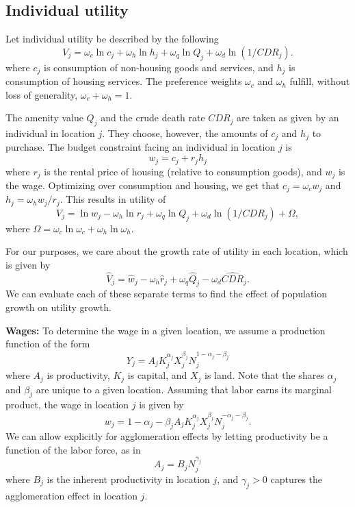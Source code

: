 \documentclass[10pt]{article}
\begin{document}
\onehalfspacing 

\subsection{Individual utility}
Let individual utility be described by the following
\begin{equation}
    V_j = \omega_c \ln c_j + \omega_h \ln h_j + \omega_q \ln Q_j + \omega_d \ln (1/CDR_j).
\end{equation}
where $c_j$ is consumption of non-housing goods and services, and $h_j$ is consumption of housing services. The preference weights $\omega_c$ and $\omega_h$ fulfill, without loss of generality, $\omega_c + \omega_h = 1$. 

The amenity value $Q_j$ and the crude death rate $CDR_j$ are taken as given by an individual in location $j$. They choose, however, the amounts of $c_j$ and $h_j$ to purchase.  The budget constraint facing an individual in location $j$ is
\begin{equation}
    w_j = c_j + r_j h_j
\end{equation}
where $r_j$ is the rental price of housing (relative to consumption goods), and $w_j$ is the wage. Optimizing over consumption and housing, we get that $c_j = \omega_c w_j$ and $h_j = \omega_h w_j/r_j$. This results in utility of
\begin{equation}
    V_j = \ln w_j - \omega_h \ln r_j + \omega_q \ln Q_j + \omega_d \ln (1/CDR_j) + \Omega,
\end{equation}
where $\Omega = \omega_c \ln \omega_c + \omega_h \ln \omega_h$. 

For our purposes, we care about the growth rate of utility in each location, which is given by
\begin{equation}
    \hat{V}_j = \hat{w}_j - \omega_h \hat{r}_j + \omega_q \hat{Q}_j - \omega_d \hat{CDR}_j.
\end{equation}
We can evaluate each of these separate terms to find the effect of population growth on utility growth.

\textbf{Wages:} To determine the wage in a given location, we assume a production function of the form
\begin{equation}
    Y_j = A_j K_j^{\alpha_j} X_j^{\beta_j} N_j^{1 - \alpha_j - \beta_j}
\end{equation}
where $A_j$ is productivity, $K_j$ is capital, and $X_j$ is land. Note that the shares $\alpha_j$ and $\beta_j$ are unique to a given location. Assuming that labor earns its marginal product, the wage in location $j$ is given by
\begin{equation}
    w_j = {1 - \alpha_j - \beta_j} A_j K_j^{\alpha_j} X_j^{\beta_j} N_j^{- \alpha_j - \beta_j}.
\end{equation}
We can allow explicitly for agglomeration effects by letting productivity be a function of the labor force, as in
\begin{equation}
    A_j = B_j N_j^{\gamma_j}
\end{equation}
where $B_j$ is the inherent productivity in location $j$, and $\gamma_j>0$ captures the agglomeration effect in location $j$. 
\end{document}

